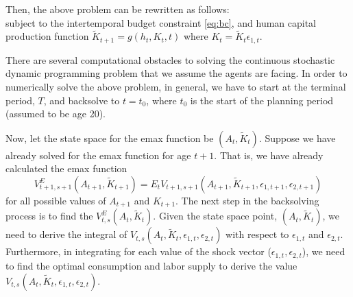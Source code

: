 \documentclass{article}
\begin{document}
Then, the above problem can be rewritten as follows:
\begin{equation*}
  \label{eq:valuenoshocks}
  
\end{equation*}
subject to the intertemporal budget constraint \eqref{eq:bc}, and human capital production function $\tilde{K}_{t+1}=g(h_t,K_t,t)$ where $K_t=\tilde{K}_t \epsilon_{1,t}$.\par
There are several computational obstacles to solving the continuous stochastic dynamic programming problem that we assume the agents are facing. In order to numerically solve the above problem, in general, we have to start at the terminal period, $T$, and backsolve to $t = t_0$, where $t_0$ is the start of the planning period (assumed to be age 20).\par
Now, let the state space for the emax function be $(A_t, \tilde{K}_t)$. Suppose we have already solved for the emax function for age $t + 1$. That is, we have already calculated the emax function
\begin{equation*}
V^E_{t+1,s+1}(A_{t+1},\tilde{K}_{t+1}) = E_t V_{t+1,s+1}(A_{t+1},\tilde{K}_{t+1},\epsilon_{1,t+1},\epsilon_{2,t+1}) 
\end{equation*}
for all possible values of $A_{t+1}$ and $K_{t+1}$. The next step in the backsolving process is to find the $V^E_{t,s} (A_t,\tilde{K}_t)$. Given the state space point, $(A_t, \tilde{K}_t)$, we need to derive the integral of $V_{t,s}(A_t, \tilde{K}_t, \epsilon_{1,t},\epsilon_{2,t})$ with respect to $\epsilon_{1,t}$ and $\epsilon_{2,t}$. Furthermore, in integrating for each value of the shock vector ($\epsilon_{1,t},\epsilon_{2,t}$), we need to find the optimal consumption and labor supply to derive the value $V_{t,s}(A_t, \tilde{K}_t, \epsilon_{1,t},\epsilon_{2,t})$. \par
\end{document}
